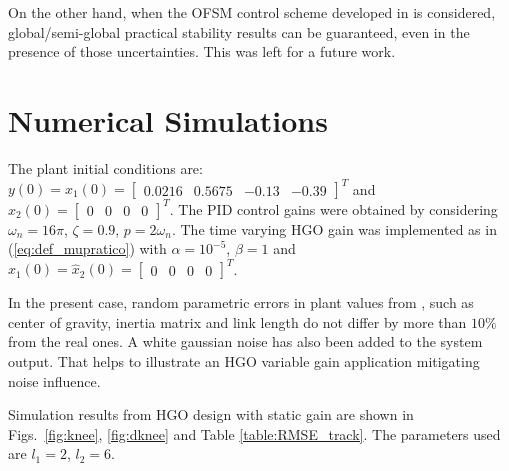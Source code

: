 \documentclass[letterpaper, 10 pt, conference]{ieeeconf}  %
\theoremstyle{plain}
\theoremstyle{definition}
\theoremstyle{remark}
\begin{document}
  
On the other hand, when the OFSM control scheme developed in \cite{POH:2011} is considered,  global/semi-global practical stability results can be guaranteed, even in the presence of those uncertainties. This was left for a future work.





%
%
%
%


\section{Numerical Simulations}
\label{sec:Numerical_Simulation}

The plant initial conditions are: $y(0)=x_1(0)=\left[\begin{array}{cccc} 0.0216  & 0.5675 & -0.13 & -0.39\end{array} \right ]^T$ and $x_2(0)=\left[\begin{array}{cccc} 0  & 0 & 0 & 0\end{array} \right ]^T$. The PID control gains were obtained by considering $\omega_n = 16\pi$, $\zeta = 0.9$, $p = 2\omega_n$. The time varying HGO gain was implemented as in (\ref{eq:def_mupratico}) with $\alpha=10^{-5}$, $\beta=1$ and $\hat{x}_1(0) = \hat{x}_2(0) = \left[\begin{array}{cccc} 0  & 0 & 0 & 0\end{array} \right ]^T$.

In the present case, random parametric errors in plant values from \cite{Richter2015}, such as center of gravity, inertia matrix and link length do not differ by more than $10\%$ from the real ones. A white gaussian noise has also been added to the system output. That helps to illustrate an HGO variable gain application mitigating noise influence.

Simulation results from HGO design with static gain are shown in Figs.~\ref{fig:knee}, \ref{fig:dknee} and Table \ref{table:RMSE_track}. The parameters used are $l_1=2$, $l_2=6$.
\end{document}
